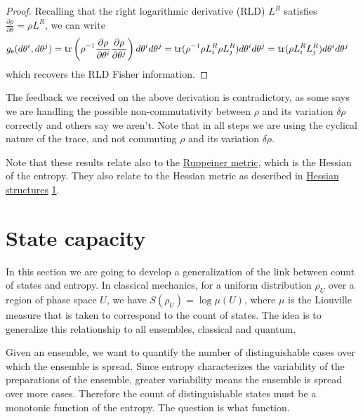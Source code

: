 \begin{mathSection}
\begin{proof}
	Recalling that the right logarithmic derivative (RLD) $L^R$ satisfies $\frac{\partial \rho}{\partial \theta} = \rho L^R$, we can write 
	\begin{equation}
		\begin{aligned}
			g_{\mathsf{e}}(d\theta^i, d\theta^j) &= \operatorname{tr}\left( \rho^{-1} \frac{\partial \rho}{\partial \theta^i }\frac{\partial \rho}{\partial \theta^j}\right) d\theta^i d\theta^j = \operatorname{tr}(\rho^{-1}\rho L^R
			_i \rho L^R_j)d\theta^i d\theta^j = \operatorname{tr}(\rho L^R
			_i L^R_j)d\theta^i d\theta^j
		\end{aligned}
	\end{equation}
	which recovers the RLD Fisher information.
\end{proof}

\begin{remark}
	The feedback we received on the above derivation is contradictory, as some says we are handling the possible non-commutativity between $\rho$ and its variation $\delta \rho$ correctly and others say we aren't. Note that in all steps we are using the cyclical nature of the trace, and not commuting $\rho$ and its variation $\delta \rho$.
\end{remark}

\begin{remark}
	Note that these results relate also to the \href{https://en.wikipedia.org/wiki/Ruppeiner_geometry}{Ruppeiner metric}, which is the Hessian of the entropy. They also relate to the Hessian metric as described in  \href{https://web.osu.cz/~Zusmanovich/seminar/2017/wolak/ostrava-11-17-hessian-pdf.pdf}{Hessian structures} \href{https://link.springer.com/chapter/10.1007/978-3-642-40020-9_4}{1}.
\end{remark}
\end{mathSection}

\section{State capacity}

In this section we are going to develop a generalization of the link between count of states and entropy. In classical mechanics, for a uniform distribution $\rho_U$ over a region of phase space $U$, we have $S(\rho_U) = \log \mu(U)$, where $\mu$ is the Liouville measure that is taken to correspond to the count of states. The idea is to generalize this relationship to all ensembles, classical and quantum.

Given an ensemble, we want to quantify the number of distinguishable cases over which the ensemble is spread. Since entropy characterizes the variability of the preparations of the ensemble, greater variability means the ensemble is spread over more cases. Therefore the count of distinguishable states must be a monotonic function of the entropy. The question is what function.

